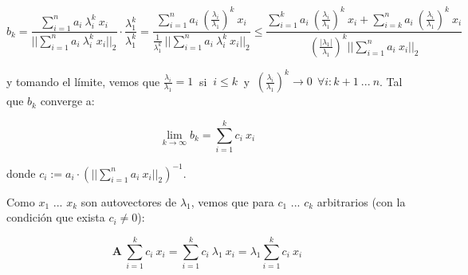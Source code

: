 \begin{equation*} \label{eq_limite}
    b_k = \frac{\sum_{i=1}^{n} a_i \ \lambda_{i}^{k} \ x_i }{||\sum_{i=1}^{n} a_i \ \lambda_{i}^{k} \ x_i||_2} \cdot \frac{\lambda_1^k}{\lambda_1^k} 
        = \frac{\sum_{i=1}^{n} a_i \ (\frac{\lambda_{i}}{\lambda_{1}})^{k} \ x_i}{\frac{1}{\lambda_{1}^{k}}\ ||\sum_{i=1}^{n} a_i \ \lambda_{i}^{k} \ x_i||_2}
        \leq \frac{\sum_{i=1}^{k} a_i\ (\frac{\lambda_{i}}{\lambda_{1}})^{k}\ x_i + \sum_{i=k}^{n} a_i \ (\frac{\lambda_{i}}{\lambda_{1}})^{k} \ x_i }{(\frac{|\lambda_{1}|}{\lambda_{1}})^k ||\sum_{i=1}^{n} a_i \ x_i||_2}
\end{equation*}

\vspace{1em}
\noindent y tomando el límite, vemos que $\frac{\lambda_{i}}{\lambda_{1}} = 1\ $ si $\ i \leq k\ $ y $\ (\frac{\lambda_{i}}{\lambda_{1}})^{k} \longrightarrow 0 \ \ \forall i: k + 1\ ...\ n$. Tal que $b_k$ converge a:

\begin{equation*}
    \lim_{k \to \infty} b_k = \sum_{i=1}^{k} c_i\ x_i  
\end{equation*}

\vspace{1em}
\noindent donde $c_i := a_i \cdot (||\sum_{i=1}^{n} a_i \ x_i||_2)^{-1}$. 


\newpage
\noindent Como $x_1$ ... $x_k$ son autovectores de $\lambda_1$, vemos que para $c_1$ ... $c_k$ arbitrarios (con la condición que exista $c_i \neq 0$):

\begin{equation*}
    \mathbf{A} \ \sum_{i=1}^{k} c_i\ x_i = \sum_{i=1}^{k} c_i\ \lambda_1\ x_i = \lambda_1 \sum_{i=1}^{k} c_i\ x_i
\end{equation*}

